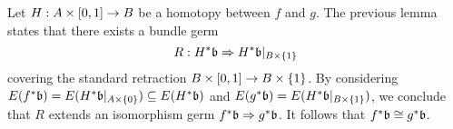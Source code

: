 \begin{scope}
\begin{myproof}
Let $H: A \times [0, 1] \to B$ be a homotopy between $f$ and $g$.
The previous lemma states that there exists a bundle germ
\[ R: H^*\mathfrak{b} \Rightarrow{}{} H^*\mathfrak{b}\vert_{B \times \{1\}} \]
covering the standard retraction $B \times [0, 1] \to B \times \{1\}$.
By considering $E(f^*\mathfrak{b}) = E(H^*\mathfrak{b}\vert_{A \times \{0\}}) \subseteq{} E(H^*\mathfrak{b})$ and $E(g^*\mathfrak{b}) = E(H^*\mathfrak{b}\vert_{B \times \{1\}})$,
we conclude that $R$ extends an isomorphism germ $f^*\mathfrak{b} \Rightarrow{}{} g^*\mathfrak{b}$.
It follows that $f^*\mathfrak{b} \cong g^*\mathfrak{b}$.
\end{myproof}

\end{scope}